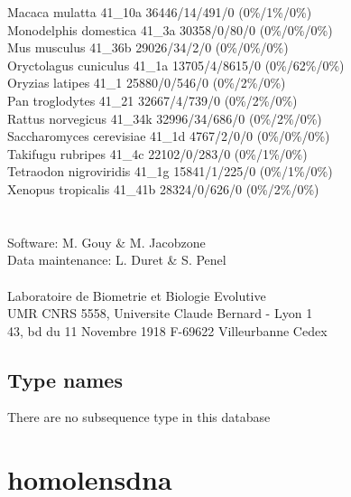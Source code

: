 \documentclass{article}
\begin{document}
\begin{Schunk}
Macaca mulatta                          41\_10a 36446/14/491/0 (0\%/1\%/0\%)\\
Monodelphis domestica                   41\_3a 30358/0/80/0 (0\%/0\%/0\%)\\
Mus musculus                            41\_36b 29026/34/2/0 (0\%/0\%/0\%)\\
Oryctolagus cuniculus                   41\_1a 13705/4/8615/0 (0\%/62\%/0\%)\\
Oryzias latipes                         41\_1 25880/0/546/0 (0\%/2\%/0\%)\\
Pan troglodytes                         41\_21 32667/4/739/0 (0\%/2\%/0\%)\\
Rattus norvegicus                       41\_34k 32996/34/686/0 (0\%/2\%/0\%)\\
Saccharomyces cerevisiae                41\_1d 4767/2/0/0 (0\%/0\%/0\%)\\
Takifugu rubripes                       41\_4c 22102/0/283/0 (0\%/1\%/0\%)\\
Tetraodon nigroviridis                  41\_1g 15841/1/225/0 (0\%/1\%/0\%)\\
Xenopus tropicalis                      41\_41b 28324/0/626/0 (0\%/2\%/0\%)\\
 \\
	     \\
Software: M. Gouy \& M. Jacobzone\\
Data maintenance: L. Duret \& S. Penel\\
\\
Laboratoire de Biometrie et Biologie Evolutive\\
UMR CNRS 5558, Universite Claude Bernard - Lyon 1 \\
43, bd du 11 Novembre 1918 F-69622 Villeurbanne Cedex\\


\subsection{Type names}
There are no subsequence type in this database
\section{ homolensdna }

\end{Schunk}
\end{document}
